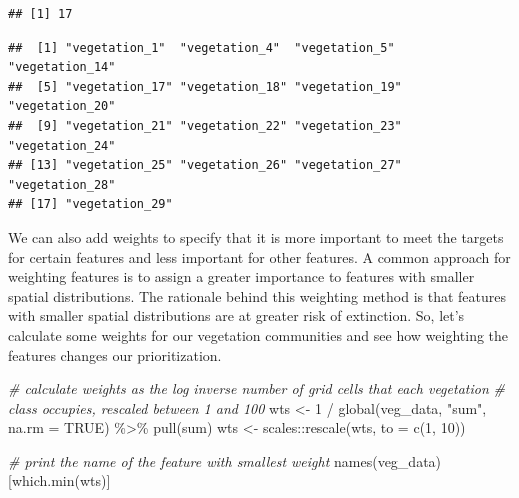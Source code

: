 \documentclass[
  12pt,
]{book}
\newenvironment{Shaded}{\begin{snugshade}}{\end{snugshade}}
\newcommand{\AttributeTok}[1]{\textcolor[rgb]{0.77,0.63,0.00}{#1}}
\newcommand{\CommentTok}[1]{\textcolor[rgb]{0.56,0.35,0.01}{\textit{#1}}}
\newcommand{\ConstantTok}[1]{\textcolor[rgb]{0.00,0.00,0.00}{#1}}
\newcommand{\DecValTok}[1]{\textcolor[rgb]{0.00,0.00,0.81}{#1}}
\newcommand{\FloatTok}[1]{\textcolor[rgb]{0.00,0.00,0.81}{#1}}
\newcommand{\FunctionTok}[1]{\textcolor[rgb]{0.00,0.00,0.00}{#1}}
\newcommand{\NormalTok}[1]{#1}
\newcommand{\OtherTok}[1]{\textcolor[rgb]{0.56,0.35,0.01}{#1}}
\newcommand{\SpecialCharTok}[1]{\textcolor[rgb]{0.00,0.00,0.00}{#1}}
\newcommand{\StringTok}[1]{\textcolor[rgb]{0.31,0.60,0.02}{#1}}
\begin{document}
\begin{verbatim}
## [1] 17
\end{verbatim}

\begin{Shaded}
\end{Shaded}

\begin{verbatim}
##  [1] "vegetation_1"  "vegetation_4"  "vegetation_5"  "vegetation_14"
##  [5] "vegetation_17" "vegetation_18" "vegetation_19" "vegetation_20"
##  [9] "vegetation_21" "vegetation_22" "vegetation_23" "vegetation_24"
## [13] "vegetation_25" "vegetation_26" "vegetation_27" "vegetation_28"
## [17] "vegetation_29"
\end{verbatim}

We can also add weights to specify that it is more important to meet the targets for certain features and less important for other features. A common approach for weighting features is to assign a greater importance to features with smaller spatial distributions. The rationale behind this weighting method is that features with smaller spatial distributions are at greater risk of extinction. So, let's calculate some weights for our vegetation communities and see how weighting the features changes our prioritization.

\begin{Shaded}
\begin{Highlighting}[]
\CommentTok{\# calculate weights as the log inverse number of grid cells that each vegetation}
\CommentTok{\# class occupies, rescaled between 1 and 100}
\NormalTok{wts }\OtherTok{\textless{}{-}} \DecValTok{1} \SpecialCharTok{/} \FunctionTok{global}\NormalTok{(veg\_data, }\StringTok{"sum"}\NormalTok{, }\AttributeTok{na.rm =} \ConstantTok{TRUE}\NormalTok{) }\SpecialCharTok{\%\textgreater{}\%}
  \FunctionTok{pull}\NormalTok{(sum)}
\NormalTok{wts }\OtherTok{\textless{}{-}}\NormalTok{ scales}\SpecialCharTok{::}\FunctionTok{rescale}\NormalTok{(wts, }\AttributeTok{to =} \FunctionTok{c}\NormalTok{(}\DecValTok{1}\NormalTok{, }\DecValTok{10}\NormalTok{))}

\CommentTok{\# print the name of the feature with smallest weight}
\FunctionTok{names}\NormalTok{(veg\_data)[}\FunctionTok{which.min}\NormalTok{(wts)]}
\end{Highlighting}
\end{Shaded}
\end{document}
